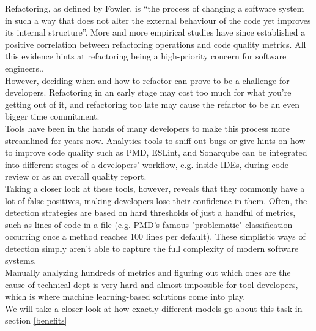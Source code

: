 Refactoring, as defined by Fowler\cite{fowler2018refactoring}, is “the process of changing a software system in such a way that does not alter the external behaviour of the code yet improves its internal structure”. More and more empirical studies have since established a positive correlation between refactoring operations and code quality metrics. All this evidence hints at refactoring being a high-priority concern for software engineers.\cite{aniche2020effectiveness}.\\
However, deciding when and how to refactor can prove to be a challenge for developers. Refactoring in an early stage may cost too much for what you're getting out of it, and refactoring too late may cause the refactor to be an even bigger time commitment.\cite{kruchten2012technical}\\
Tools have been in the hands of many developers to make this process more streamlined for years now. Analytics tools to sniff out bugs or give hints on how to improve code quality such as PMD, ESLint, and Sonarqube can be integrated into different stages of a developers' workflow, e.g. inside IDEs, during code review or as an overall quality report. \cite{aniche2020effectiveness}\\
Taking a closer look at these tools, however, reveals that they commonly have a lot of false positives, making developers lose their confidence in them. Often, the detection strategies are based on hard thresholds of just a handful of metrics, such as lines of code in a file (e.g. PMD's famous "problematic" classification occurring once a method reaches 100 lines per default). These simplistic ways of detection simply aren't able to capture the full complexity of modern software systems.\\
Manually analyzing hundreds of metrics and figuring out which ones are the cause of technical dept is very hard and almost impossible for tool developers, which is where machine learning-based solutions come into play.\cite{kataoka2002refactoring}\cite{leitch2003maintainability}\\
We will take a closer look at how exactly different models go about this task in section \ref{benefits}
